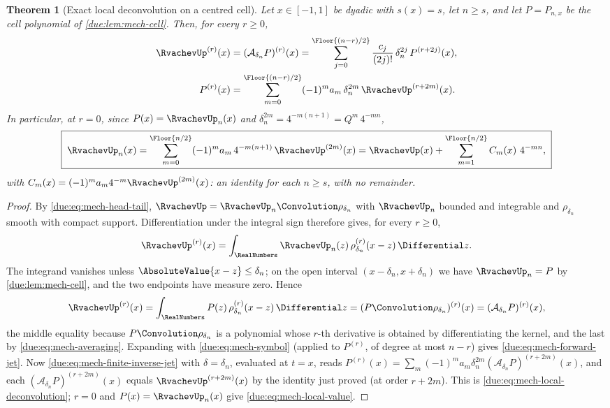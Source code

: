\documentclass[11pt,oneside]{article}
\theoremstyle{plain}
\newtheorem{theorem}{Theorem}[section]
\theoremstyle{definition}
\theoremstyle{remark}
\newcommand{\upn}[1]{\RvachevUp_{#1}}
\newcommand{\dep}[1]{s\!\left(#1\right)}                    %
\newcommand{\Qq}{Q}                                         %
\newcommand{\am}[1]{a_{#1}}                                 %
\newcommand{\Cr}[2]{C_{#1}\!\left(#2\right)}                %
\begin{document}
\begin{theorem}[Exact local deconvolution on a centred cell]
\label{due:thm:mech-local-deconvolution}
Let \(x\in[-1,1]\) be dyadic with \(\dep{x}=s\), let \(n\ge s\), and let
\(P=P_{n,x}\) be the cell polynomial of \cref{due:lem:mech-cell}.  Then, for
\emph{every} \(r\ge0\),
\begin{align}
 \RvachevUp^{(r)}(x)
 &=(\mathcal A_{\delta_n}P)^{(r)}(x)
 =\sum_{j=0}^{\Floor{(n-r)/2}}\frac{c_j}{(2j)!}\,\delta_n^{2j}\,P^{(r+2j)}(x),
 \label{due:eq:mech-forward-jet}\\
 P^{(r)}(x)
 &=\sum_{m=0}^{\Floor{(n-r)/2}}(-1)^{m}\am{m}\,\delta_n^{2m}\,
 \RvachevUp^{(r+2m)}(x).
 \label{due:eq:mech-local-deconvolution}
\end{align}
In particular, at \(r=0\), since \(P(x)=\upn{n}(x)\) and
\(\delta_n^{2m}=4^{-m(n+1)}=\Qq^{m}\,4^{-mn}\),
\begin{equation}
 \boxed{\;
 \upn{n}(x)=\sum_{m=0}^{\Floor{n/2}}(-1)^{m}\am{m}\,4^{-m(n+1)}\,
 \RvachevUp^{(2m)}(x)
 =\RvachevUp(x)+\sum_{m=1}^{\Floor{n/2}}
 \Cr{m}{x}\,4^{-mn},\;}
 \label{due:eq:mech-local-value}
\end{equation}
with \(\Cr{m}{x}=(-1)^{m}\am{m}4^{-m}\RvachevUp^{(2m)}(x)\): an identity for
each \(n\ge s\), with no remainder.
\end{theorem}

\begin{proof}
By \cref{due:eq:mech-head-tail}, \(\RvachevUp=\upn{n}\Convolution\rho_{\delta_n}\)
with \(\upn{n}\) bounded and integrable and \(\rho_{\delta_n}\) smooth with
compact support.  Differentiation under the integral sign therefore gives,
for every \(r\ge0\),
\[
 \RvachevUp^{(r)}(x)=\int_{\RealNumbers}\upn{n}(z)\,\rho_{\delta_n}^{(r)}(x-z)\,\Differential z .
\]
The integrand vanishes unless \(\AbsoluteValue{x-z}\le\delta_n\); on the
open interval \((x-\delta_n,x+\delta_n)\) we have \(\upn{n}=P\) by
\cref{due:lem:mech-cell}, and the two endpoints have measure zero.  Hence
\[
 \RvachevUp^{(r)}(x)=\int_{\RealNumbers}P(z)\,\rho_{\delta_n}^{(r)}(x-z)\,\Differential z
 =(P\Convolution\rho_{\delta_n})^{(r)}(x)=(\mathcal A_{\delta_n}P)^{(r)}(x),
\]
the middle equality because \(P\Convolution\rho_{\delta_n}\) is a polynomial
whose \(r\)-th derivative is obtained by differentiating the kernel, and the
last by \cref{due:eq:mech-averaging}.  Expanding with
\cref{due:eq:mech-symbol} (applied to \(P^{(r)}\), of degree at most
\(n-r\)) gives \cref{due:eq:mech-forward-jet}.  Now
\cref{due:eq:mech-finite-inverse-jet} with \(\delta=\delta_n\), evaluated at
\(t=x\), reads
\(P^{(r)}(x)=\sum_m(-1)^m\am{m}\delta_n^{2m}(\mathcal A_{\delta_n}P)^{(r+2m)}(x)\),
and each \((\mathcal A_{\delta_n}P)^{(r+2m)}(x)\) equals
\(\RvachevUp^{(r+2m)}(x)\) by the identity just proved (at order \(r+2m\)).
This is \cref{due:eq:mech-local-deconvolution}; \(r=0\) and
\(P(x)=\upn{n}(x)\) give \cref{due:eq:mech-local-value}.
\end{proof}
\end{document}
